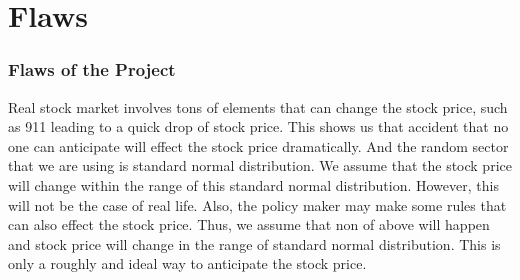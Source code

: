 \documentclass[mathserif]{beamer}
\begin{document}
\section{Flaws}
\begin{frame}
\frametitle{Flaws of the Project}
Real stock market involves tons of elements that can change the stock price, such as 911 leading to a quick drop of stock price. This shows us that accident that no one can anticipate will effect the stock price dramatically. And the random sector that we are using is standard normal distribution. We assume that the stock price will change within the range of this standard normal distribution. However, this will not be the case of real life. Also, the policy maker may make some rules that can also effect the stock price. Thus, we assume that non of above will happen and stock price will change in the range of standard normal distribution. This is only a roughly and ideal way to anticipate the stock price. 
\end{frame}
\end{document}
